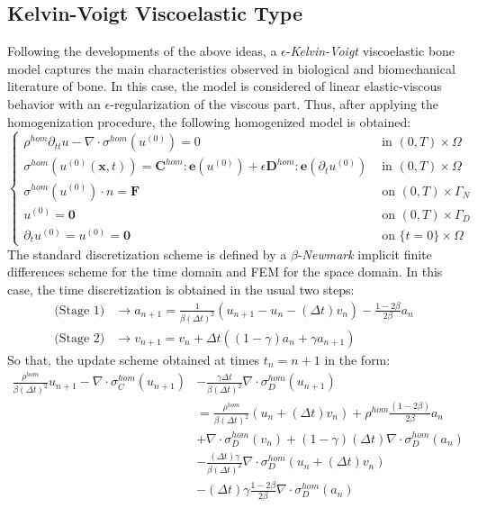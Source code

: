 \subsection{Kelvin-Voigt Viscoelastic Type}
Following the developments of the above ideas, a $\epsilon$-\textit{Kelvin-Voigt} viscoelastic bone model captures the main characteristics observed in biological and biomechanical literature of bone. In this case, the model is considered of linear elastic-viscous behavior with an $\epsilon$-regularization of the viscous part.
Thus, after applying the homogenization procedure, the following homogenized model is obtained:
\begin{equation*}
    \left \{
    \begin{array}{cc}
        \rho^{hom} \partial_{tt} u - \nabla \cdot \sigma^{hom}(u^{(0)}) = 0 & \text{ in } (0,T)\times\Omega\\
        \sigma^{hom}(u^{(0)}(\mathbf{x},t)) =  \mathbf{C}^{hom}:\mathbf{e}(u^{(0)}) + \epsilon \mathbf{D}^{hom}:\mathbf{e}(\partial_{t}u^{(0)}) & \text{ in }(0,T)\times \Omega\\
        \sigma^{hom}(u^{(0)})\cdot n = \mathbf{F} & \text{ on }(0,T)\times\Gamma_N\\
        u^{(0)} = \mathbf{0} & \text{ on }(0,T)\times\Gamma_D \\
    \partial_t u^{(0)} = u^{(0)} = \mathbf{0} &  \text{ on } \{t=0\}\times\Omega
    \end{array}
    \right .
\end{equation*}
The standard discretization scheme is defined by a $\beta$-\textit{Newmark} implicit finite differences scheme for the time domain and FEM for the space domain. In this case, the time discretization is obtained in the usual two steps:
\begin{align*}
    \text{(Stage 1)} &\longrightarrow a_{n+1} = \frac{1}{\beta (\Delta t)^2} (u_{n+1}-u_{n}-(\Delta t)v_n) - \frac{1-2\beta}{2\beta}a_n\\
    \text{(Stage 2)}& \longrightarrow v_{n+1} = v_n + \Delta t((1-\gamma)a_n + \gamma a_{n+1})
\end{align*}
So that, the update scheme obtained at times $t_n = n+1$ in the form:
\begin{align*}
    \frac{\rho^{hom}}{\beta (\Delta t)^2} u_{n+1} - \nabla \cdot \sigma_C^{hom}( u_{n+1})  & - \frac{\gamma \Delta t}{\beta (\Delta t)^2} \nabla \cdot \sigma_D^{hom}(u_{n+1}) \\
    &= \frac{\rho^{hom}}{\beta (\Delta t)^2} (u_n + (\Delta t)v_n) + \rho^{hom}\frac{ (1-2\beta)}{2\beta} a_n \\
    & + \nabla \cdot \sigma_D^{hom}(v_n) + (1-\gamma)(\Delta t) \nabla\cdot \sigma_D^{hom}(a_n) \\
    & - \frac{(\Delta t)\gamma}{\beta (\Delta t)^2}\nabla \cdot \sigma_D^{hom}(u_n + (\Delta t)v_n) \\
    & - (\Delta t)\gamma\frac{1-2\beta}{2 \beta} \nabla \cdot \sigma_D^{hom}(a_n)
\end{align*}

